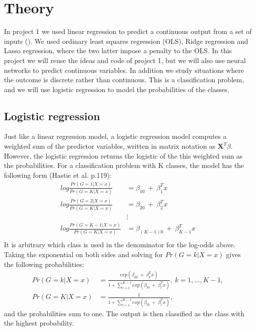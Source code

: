 
\section{Theory}
In project 1 we used linear regression to predict a continuous output from a set of inputs (). We used ordinary least squares regression (OLS), Ridge regression and Lasso regression, where the two latter impose a penalty to the OLS. In this project we will reuse the ideas and code of project 1, but we will also use neural networks to predict continuous variables. In addition we study situations where the outcome is discrete rather than continuous. This is a classification problem, and we will use logistic regression to model the probabilities of the classes.\\

\subsection{Logistic regression}
Just like a linear regression model, a logistic regression model computes a weighted sum of the predictor variables, written in matrix notation as $\bm{X}^T\beta$. However, the logistic regression returns the logistic of the this weighted sum as the probabilities. For a classification problem with K classes, the model has the following form (Hastie et al. p.119):\\
\begin{equation}\label{eqT:logreg_def}
\begin{split}
log\frac{Pr(G=1|X=x)}{Pr(G=K|X=x)} &= \beta_{10}\ +\ \beta_{1}^Tx\\
log\frac{Pr(G=2|X=x)}{Pr(G=K|X=x)} &= \beta_{20}\ +\ \beta_{2}^Tx\\
&\vdots\\
log\frac{Pr(G=K-1|X=x)}{Pr(G=K|X=x)} &= \beta_{(K-1)0}\ +\ \beta_{K-1}^Tx\\
\end{split}
\end{equation}
It is arbitrary which class is used in the denominator for the log-odds above. Taking the exponential on both sides and solving for $Pr(G=k|X=x)$ gives the following probabilities:\\
\begin{equation}\label{eqT:logreg_prob}
\begin{split}
Pr(G=k|X=x) &= \frac{exp(\beta_{k0}\ +\ \beta_{k}^Tx)}{1+\sum_{l=1}^{K-1}exp(\beta_{l0}\ +\ \beta_{l}^Tx)},\ k=1,...,K-1,\\
Pr(G=K|X=x) &= \frac{1}{1+\sum_{l=1}^{K-1}exp(\beta_{l0}\ +\ \beta_{l}^Tx)},
\end{split}
\end{equation}
and the probabilities sum to one. The output is then classified as the class with the highest probability.\\

